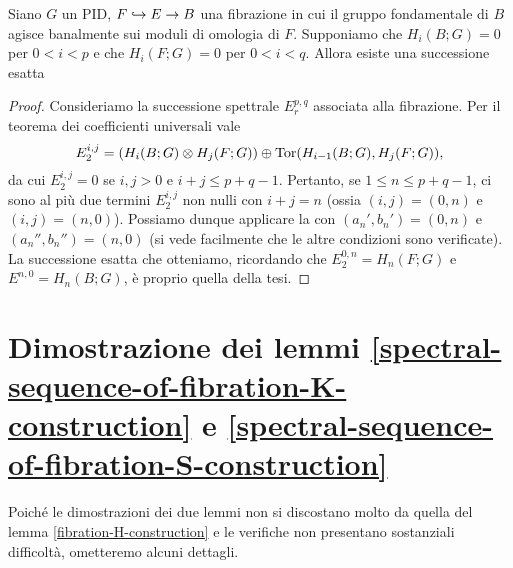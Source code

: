 \begin{proposition}
Siano $G$ un PID, $F\hookrightarrow E\to B$ una fibrazione in cui il gruppo fondamentale di $B$ agisce banalmente sui moduli di omologia di $F$. Supponiamo che $H_i(B;G)=0$ per $0<i<p$ e che $H_i(F;G)=0$ per $0<i<q$. Allora esiste una successione esatta
\end{proposition}
\begin{proof}
Consideriamo la successione spettrale $E^{p,q}_r$ associata alla fibrazione. Per il teorema dei coefficienti universali vale
$$
E^{i,j}_2=(H_i(B;G)\mathbin{\otimes} H_j(F;G))\mathbin{\oplus}\operatorname{Tor}(H_{i-1}(B;G),H_j(F;G)),
$$
da cui $E^{i,j}_2=0$ se $i,j>0$ e $i+j\le p+q-1$. Pertanto, se $1\le n\le p+q-1$, ci sono al più due termini $E^{i,j}_2$ non nulli con $i+j=n$ (ossia $(i,j)=(0,n)$ e $(i,j)=(n,0)$). Possiamo dunque applicare la  con $(a_n',b_n')=(0,n)$ e $(a_n'',b_n'')=(n,0)$ (si vede facilmente che le altre condizioni sono verificate). La successione esatta che otteniamo, ricordando che $E^{0,n}_2=H_n(F;G)$ e $E^{n,0}=H_n(B;G)$, è proprio quella della tesi.
\end{proof}

\section{Dimostrazione dei lemmi \ref{spectral-sequence-of-fibration-K-construction} e \ref{spectral-sequence-of-fibration-S-construction}}\label{spectral-sequence-of-fibration:proofs}
Poiché le dimostrazioni dei due lemmi non si discostano molto da quella del lemma \ref{fibration-H-construction} e le verifiche non presentano sostanziali difficoltà, ometteremo alcuni dettagli.

